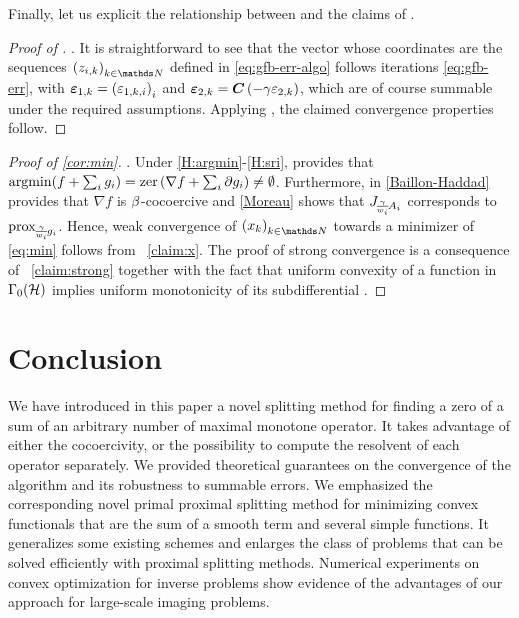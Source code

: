 Finally, let us explicit the relationship between  and the claims of .

\ifx\siam\undefined \begin{proof}[Proof of ]
. \fi
%
It is straightforward to see that the vector whose coordinates are the sequences $\pa{z_{i,k}}_{k \in \N}$ defined in \eqref{eq:gfb-err-algo} follows iterations \eqref{eq:gfb-err}, with $\boldsymbol{\varepsilon}_{1,k} = \left( \varepsilon_{1,k,i} \right)_i$ and $\boldsymbol{\varepsilon}_{2,k} = \boldsymbol C \left(  - \gamma \varepsilon_{2,k}  \right)$, which are of course summable under the required assumptions. Applying , the claimed convergence properties follow.
\ifx\siam\undefined \end{proof} \else \endproof \fi


\ifx\siam\undefined \begin{proof}[Proof of \cref{cor:min}]
. \fi
Under \ref{H:argmin}-\ref{H:sri}, \cite[Theorem~16.2 and Theorem~16.37(i)]{BauschkeCombettes11} provides that $\operatorname{argmin}(f + \sum_i g_i) = \operatorname{zer}{\left( \nabla f + \sum_i \partial g_i \right)} \neq \emptyset$. Furthermore, in \ref{Baillon-Haddad} provides that $\nabla f$ is $\beta$-cocoercive and \ref{Moreau} shows that $J_{\!\frac{\gamma}{w_i}\!A_i}$ corresponds to $\operatorname{prox}_{\!\frac{\gamma}{w_i}\!g_i}$. Hence, weak convergence of $\pa{x_k}_{k \in \N}$ towards a minimizer of \eqref{eq:min} follows from ~\ref{claim:x}. The proof of strong convergence is a consequence of ~\ref{claim:strong} together with the fact that uniform convexity of a function in $\Gamma_0(\mathcal{H})$ implies uniform monotonicity of its subdifferential \cite{BauschkeCombettes11}.
%
\ifx\siam\undefined \end{proof} \else \endproof \fi

\section{Conclusion}

We have introduced in this paper a novel splitting method for finding a zero of a sum of an arbitrary number of maximal monotone operator. It takes advantage of either the cocoercivity, or the possibility to compute the resolvent of each operator separately. We provided theoretical guarantees on the convergence of the algorithm and its robustness to summable errors. We emphasized the corresponding novel primal proximal splitting method for minimizing convex functionals that are the sum of a smooth term and several simple functions. It generalizes some existing schemes and enlarges the class of problems that can be solved efficiently with proximal splitting methods. Numerical experiments on convex optimization for inverse problems show evidence of the advantages of our approach for large-scale imaging problems.
